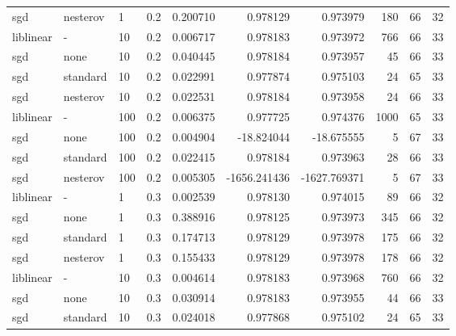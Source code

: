 \begin{tabular}{llllrrrrrr}
      sgd &      nesterov &   1 &     0.2 &  0.200710 &     0.978129 &     0.973979 &     180 &           66 &         32 \\
liblinear &             - &  10 &     0.2 &  0.006717 &     0.978183 &     0.973972 &     766 &           66 &         33 \\
      sgd &          none &  10 &     0.2 &  0.040445 &     0.978184 &     0.973957 &      45 &           66 &         33 \\
      sgd &      standard &  10 &     0.2 &  0.022991 &     0.977874 &     0.975103 &      24 &           65 &         33 \\
      sgd &      nesterov &  10 &     0.2 &  0.022531 &     0.978184 &     0.973958 &      24 &           66 &         33 \\
liblinear &             - & 100 &     0.2 &  0.006375 &     0.977725 &     0.974376 &    1000 &           65 &         33 \\
      sgd &          none & 100 &     0.2 &  0.004904 &   -18.824044 &   -18.675555 &       5 &           67 &         33 \\
      sgd &      standard & 100 &     0.2 &  0.022415 &     0.978184 &     0.973963 &      28 &           66 &         33 \\
      sgd &      nesterov & 100 &     0.2 &  0.005305 & -1656.241436 & -1627.769371 &       5 &           67 &         33 \\
liblinear &             - &   1 &     0.3 &  0.002539 &     0.978130 &     0.974015 &      89 &           66 &         32 \\
      sgd &          none &   1 &     0.3 &  0.388916 &     0.978125 &     0.973973 &     345 &           66 &         32 \\
      sgd &      standard &   1 &     0.3 &  0.174713 &     0.978129 &     0.973978 &     175 &           66 &         32 \\
      sgd &      nesterov &   1 &     0.3 &  0.155433 &     0.978129 &     0.973978 &     178 &           66 &         32 \\
liblinear &             - &  10 &     0.3 &  0.004614 &     0.978183 &     0.973968 &     760 &           66 &         32 \\
      sgd &          none &  10 &     0.3 &  0.030914 &     0.978183 &     0.973955 &      44 &           66 &         33 \\
      sgd &      standard &  10 &     0.3 &  0.024018 &     0.977868 &     0.975102 &      24 &           65 &         33 \\

\end{tabular}
